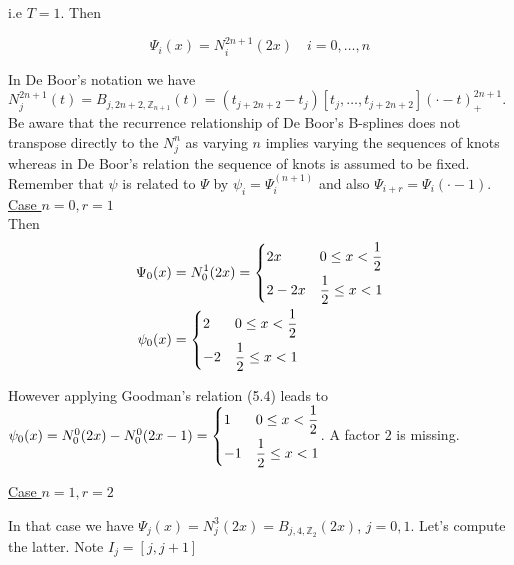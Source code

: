 \documentclass[a4paper, 11pt]{article}
\begin{document}
i.e $T=1$. Then 

\begin{equation}
  \Psi_i(x) = N_i^{2n+1}(2x) \quad i=0, \ldots, n
\end{equation}

In De Boor's notation we have $N_j^{2n+1}(t) = B_{j, 2n+2, \mathbb{Z}_{n+1}}(t) = (t_{j+2n+2} - t_j)[t_j, \ldots, 
t_{j+2n+2}]{(\cdot - t)}_+^{2n+1}$. Be aware that the recurrence relationship of De Boor's B-splines does not transpose 
directly to the $N_j^n$ as varying $n$ implies varying the sequences of knots whereas in De Boor's relation the sequence 
of knots is assumed to be fixed. \\

Remember that $\psi$ is related to $\Psi$ by $\psi_i = \Psi_i^{(n+1)}$ and also $\Psi_{i+r} = \Psi_i(\cdot - 1)$.\\

\underline{Case $n=0, r=1$} \mbox{} \\
Then
\begin{align*}
  \Psi_0(x) &= N_0^1(2x) = \begin{dcases} 2x & 0 \leq x < \frac{1}{2} \\ 2-2x & \frac{1}{2}\leq x < 1 \end{dcases} \\
  \psi_0(x) &= \begin{dcases} 2 & 0 \leq x < \frac{1}{2} \\ -2 & \frac{1}{2} \leq x < 1 \end{dcases}
\end{align*}
 
However applying Goodman's relation (5.4) leads to $\psi_0(x) = N_0^0(2x) - N_0^0(2x-1) = \begin{dcases} 1 & 0 \leq x < 
\frac{1}{2} \\ -1 & \frac{1}{2} \leq x < 1 \end{dcases}$. A factor $2$ is missing.

\underline{Case $n=1, r=2$}

In that case we have $\Psi_j(x) = N_j^3(2x) = B_{j, 4, \mathbb{Z}_2}(2x)$, $j=0,1$. Let's compute the latter. Note $I_j 
= [j, j+1]$
\end{document}
